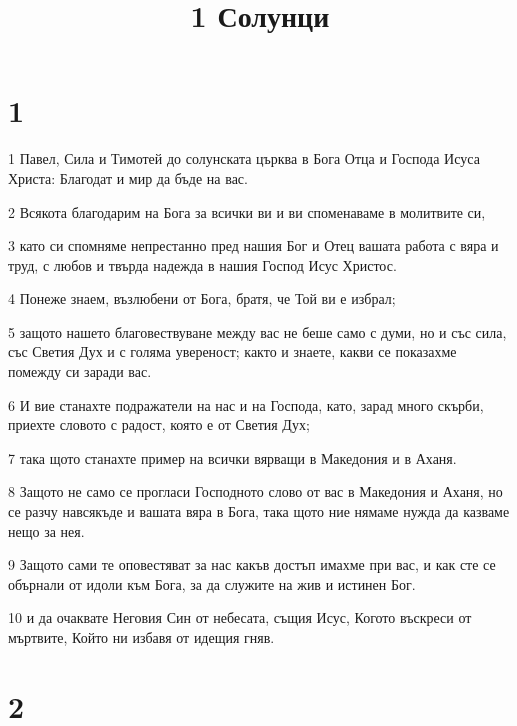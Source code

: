 

\title{1 Солунци}


\chapter{1}

\par 1 Павел, Сила и Тимотей до солунската църква в Бога Отца и Господа Исуса Христа: Благодат и мир да бъде на вас.
\par 2 Всякота благодарим на Бога за всички ви и ви споменаваме в молитвите си,
\par 3 като си спомняме непрестанно пред нашия Бог и Отец вашата работа с вяра и труд, с любов и твърда надежда в нашия Господ Исус Христос.
\par 4 Понеже знаем, възлюбени от Бога, братя, че Той ви е избрал;
\par 5 защото нашето благовествуване между вас не беше само с думи, но и със сила, със Светия Дух и с голяма увереност; както и знаете, какви се показахме помежду си заради вас.
\par 6 И вие станахте подражатели на нас и на Господа, като, зарад много скърби, приехте словото с радост, която е от Светия Дух;
\par 7 така щото станахте пример на всички вярващи в Македония и в Аханя.
\par 8 Защото не само се прогласи Господното слово от вас в Македония и Аханя, но се разчу навсякъде и вашата вяра в Бога, така щото ние нямаме нужда да казваме нещо за нея.
\par 9 Защото сами те оповестяват за нас какъв достъп имахме при вас, и как сте се обърнали от идоли към Бога, за да служите на жив и истинен Бог.
\par 10 и да очаквате Неговия Син от небесата, същия Исус, Когото въскреси от мъртвите, Който ни избавя от идещия гняв.

\chapter{2}

